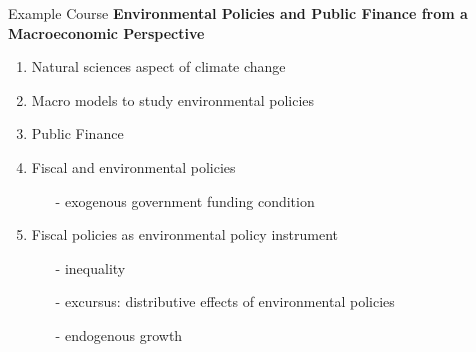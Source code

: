 \begin{frame}{Example Course}
\alert{\textbf{Environmental Policies and Public Finance from a Macroeconomic Perspective}}
	\pause
\begin{enumerate}[<+->]
	\item Natural sciences aspect of climate change \footnotesize{\citep{Hassler2016EnvironmentalMacroeconomics, Hsiang2018AnScience}} \normalsize
	\item Macro models to study environmental policies \footnotesize{\citep{Acemoglu2012TheChange, Golosov2014OptimalEquilibrium, Acemoglu2016TransitionTechnology, Fried2018ClimateAnalysis}} \normalsize
	\item Public Finance \footnotesize{\citep{ Domeij2004OnTaxes, Conesa2009TaxingAll, Heathcote2017OptimalFramework}} \normalsize
	\item Fiscal and environmental policies
	\begin{itemize}
		\item[-] exogenous government funding condition \footnotesize{\citep{LansBovenberg1994EnvironmentalTaxation, Goulder1995EnvironmentalGuide, Barrage2019OptimalPolicy}}
	\end{itemize}
\item Fiscal policies as environmental policy instrument
\begin{itemize}
		\item[-] inequality \footnotesize{\citep{Jacobs2019RedistributionCurves, Dobkowitz2022, Douenne2022OptimalHouseholds}} \normalsize
		\item[-] excursus: distributive effects of environmental policies \footnotesize{\citep{Fried2018TheGenerations, Goulder2019IncomeGroups, Kotlikoff2021MakingWin}} \normalsize
		\item[-] endogenous growth
\end{itemize}
\end{enumerate}
\end{frame}

